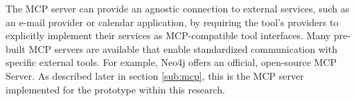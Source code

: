 
The MCP server can provide an agnostic connection to external services, such as an e-mail provider or calendar application, by requiring the tool's providers to explicitly implement their services as MCP-compatible tool interfaces. \cite{hou2025model} Many pre-built MCP servers are available that enable standardized communication with specific external tools. For example, Neo4j offers an official, open-source MCP Server. As described later in section \ref{sub:mcp}, this is the MCP server implemented for the prototype within this research. \cite{neo4j_mcp_2025}